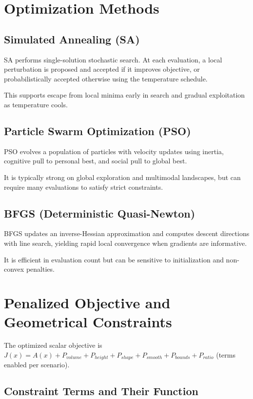 \chapter{Optimization Methods}


\section{Simulated Annealing (SA)}

SA performs single-solution stochastic search. At each evaluation, a local perturbation is proposed and accepted if it improves objective, or probabilistically accepted otherwise using the temperature schedule.

This supports escape from local minima early in search and gradual exploitation as temperature cools.


\section{Particle Swarm Optimization (PSO)}

PSO evolves a population of particles with velocity updates using inertia, cognitive pull to personal best, and social pull to global best.

It is typically strong on global exploration and multimodal landscapes, but can require many evaluations to satisfy strict constraints.


\section{BFGS (Deterministic Quasi-Newton)}

BFGS updates an inverse-Hessian approximation and computes descent directions with line search, yielding rapid local convergence when gradients are informative.

It is efficient in evaluation count but can be sensitive to initialization and non-convex penalties.


\chapter{Penalized Objective and Geometrical Constraints}

The optimized scalar objective is \(J(x) = A(x) + P_{volume} + P_{height} + P_{shape} + P_{smooth} + P_{bounds} + P_{ratio}\) (terms enabled per scenario).


\section{Constraint Terms and Their Function}

